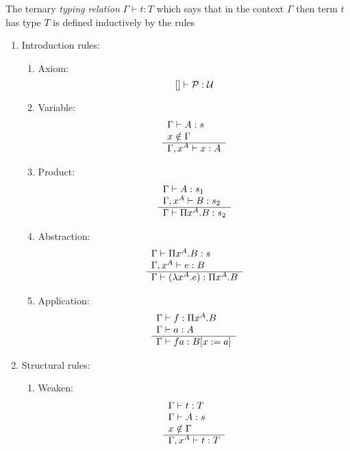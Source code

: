 \begin{definition}
The ternary \emph{typing relation} $\Gamma \vdash t: T$ which says that in
the context $\Gamma$ then term $t$ has type $T$ is defined inductively by
the rules
\begin{enumerate}
    \item Introduction rules:
    \begin{enumerate}
        \item Axiom:
            $$
            [] \vdash {\cal P} : {\cal U}
            $$

        \item Variable:
            $$
            \begin{array}{l} 
                \Gamma \vdash A: s
                \\
                x \notin \Gamma
             \\ \hline 
                \Gamma, x^A \vdash x: A
            \end{array}
            $$

        \item Product:
            $$
            \begin{array}{l} 
                \Gamma \vdash A: s_1
                \\
                \Gamma, x^A \vdash B: s_2
             \\ \hline 
                \Gamma \vdash \Pi x^A.B : s_2
            \end{array}
            $$

        \item Abstraction:
            $$
            \begin{array}{l} 
                \Gamma \vdash \Pi x^A. B: s
                \\
                \Gamma, x^A \vdash e: B
             \\ \hline 
                \Gamma \vdash (\lambda x^A. e): \Pi x^A. B
            \end{array}
            $$

        \item Application:
            $$
            \begin{array}{l} 
                \Gamma \vdash f: \Pi x^A. B
                \\
                \Gamma \vdash a: A
             \\ \hline 
                \Gamma \vdash f a: B[x:=a]
            \end{array}
            $$
    \end{enumerate}


    \item Structural rules:
        \begin{enumerate}
            \item Weaken:
                $$
                \begin{array}{l} 
                    \Gamma \vdash t: T
                    \\
                    \Gamma \vdash A: s
                    \\
                    x \notin \Gamma
                 \\ \hline 
                    \Gamma, x^A \vdash t: T
                \end{array}
                $$


\end{enumerate}
\end{enumerate}
\end{definition}
